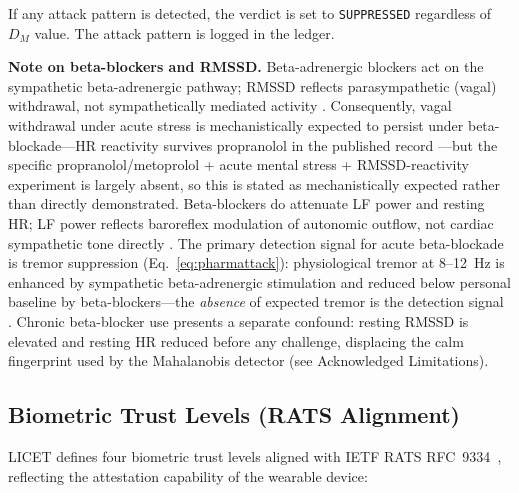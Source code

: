 \documentclass[12pt,a4paper]{article}
\begin{document}
If any attack pattern is detected, the verdict is set to \texttt{SUPPRESSED}
regardless of $D_M$ value. The attack pattern is logged in the ledger.

\textbf{Note on beta-blockers and RMSSD.} Beta-adrenergic blockers act on the
sympathetic beta-adrenergic pathway; RMSSD reflects parasympathetic (vagal)
withdrawal, not sympathetically mediated activity \cite{brantigan1982}.
Consequently, vagal withdrawal under acute stress is mechanistically expected
to persist under beta-blockade---HR reactivity survives propranolol in the
published record \cite{steptoe2018betablocker}---but the specific
propranolol/metoprolol + acute mental stress + RMSSD-reactivity experiment is
largely absent, so this is stated as mechanistically expected rather than
directly demonstrated. Beta-blockers do attenuate LF power and resting HR;
LF power reflects baroreflex modulation of autonomic outflow, not cardiac
sympathetic tone directly \cite{moak2007lf, goldstein2011lf}. The primary
detection signal for acute beta-blockade is tremor suppression
(Eq.~\ref{eq:pharmattack}): physiological tremor at 8--12~Hz is enhanced by
sympathetic beta-adrenergic stimulation and reduced below personal baseline by
beta-blockers---the \emph{absence} of expected tremor is the detection signal
\cite{lakie2019tremor}. Chronic beta-blocker use presents a separate
confound: resting RMSSD is elevated and resting HR reduced before any
challenge, displacing the calm fingerprint used by the Mahalanobis detector
(see Acknowledged Limitations).

\subsection{Biometric Trust Levels (RATS Alignment)}
\label{sec:trustlevels}

LICET defines four biometric trust levels aligned with IETF RATS
RFC~9334~\cite{rfc9334}, reflecting the attestation capability of the wearable
device:
\end{document}
